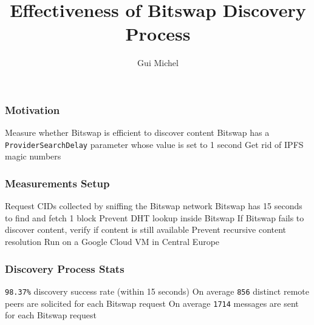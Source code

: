 \documentclass{pl-slide}
\title{Effectiveness of Bitswap Discovery Process }
\author{Gui Michel}
\institute{Protocol Labs}
\date{\DTMdate{2023-01-04}}
\begin{document}
\frame{\titlepage}

\begin{frame}
\frametitle{Motivation}
\begin{itemize}
	\itemc Measure whether Bitswap is efficient to discover content
	\itemc Bitswap has a \texttt{ProviderSearchDelay} parameter whose value is set to 1 second
	\itemc Get rid of IPFS magic numbers

\end{itemize}
\end{frame}

\begin{frame}
\frametitle{Measurements Setup}
\begin{itemize}
	\itemc Request CIDs collected by sniffing the Bitswap network
	\itemc Bitswap has 15 seconds to find and fetch 1 block
	\itemc Prevent DHT lookup inside Bitswap
	\itemc If Bitswap fails to discover content, verify if content is still available
	\itemc Prevent recursive content resolution
	\itemc Run on a Google Cloud VM in Central Europe
\end{itemize}
\end{frame}

\begin{frame}
\frametitle{Discovery Process Stats}
\begin{itemize}
	\itemc \texttt{98.37\%} discovery success rate (within 15 seconds)
	\itemc On average \texttt{856} distinct remote peers are solicited for each Bitswap request
	\itemc On average \texttt{1714} messages are sent for each Bitswap request
\end{itemize}
\end{frame}
\end{document}
